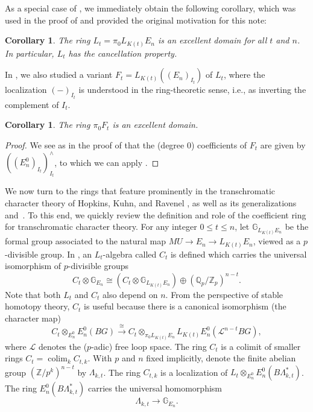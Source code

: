 \documentclass[oneside]{amsart}
\newcommand{\lra}[1]{\overset{#1}{\longrightarrow}}
\newtheorem{cor}[thm]{Corollary}
\theoremstyle{definition}
\theoremstyle{remark}
\theoremstyle{theorem}
\numberwithin{equation}{section}
\DeclareMathOperator{\colim}{colim}
\newcommand{\Q}{\mathbb{Q}}
\newcommand{\E}{E_{n}}
\newcommand{\Z}{\mathbb{Z}}
\newcommand{\lkt}{\Lambda_{k,t}}
\newcommand{\bG}{\mathbb{G}}
\newcommand{\cL}{\mathcal{L}}
\begin{document}
As a special case of , we immediately obtain the following corollary, which was used in the proof of \cite[Lem.~4.4]{bs_bpetheory} and provided the original motivation for this note:

\begin{cor}\label{cor:lt}
The ring $L_t = \pi_0L_{K(t)}E_n$ is an excellent domain for all $t$ and $n$. In particular, $L_t$ has the cancellation property. 
\end{cor}

In \cite{bs_bpetheory}, we also studied a variant $F_t = L_{K(t)}((E_n)_{I_t})$ of $L_t$, where the localization $(-)_{I_t}$ is understood in the ring-theoretic sense, i.e., as inverting the complement of $I_t$. 

\begin{cor}\label{cor:ft}
The ring $\pi_0F_t$ is an excellent domain. 
\end{cor}
\begin{proof}
We see as in the proof of  that the (degree 0) coefficients of $F_t$ are given by $((E_n^0)_{I_t})_{I_t}^{\wedge}$, to which we can apply . 
\end{proof}

We now turn to the rings that feature prominently in the transchromatic character theory of Hopkins, Kuhn, and Ravenel \cite{hkr}, as well as its generalizations~\cite{stapleton_tgcm} and~\cite{bs_centralizers}. To this end, we quickly review the definition and role of the coefficient ring for transchromatic character theory. For any integer $0 \le t \le n$, let $\bG_{L_{K(t)}E_n}$ be the formal group associated to the natural map $MU \to E_n \to L_{K(t)}E_n$, viewed as a $p$-divisible group. In \cite{stapleton_tgcm}, an $L_t$-algebra called $C_t$ is defined which carries the universal isomorphism of $p$-divisible groups
\[
C_t \otimes \bG_{\E} \cong (C_t \otimes \bG_{L_{K(t)}E_n}) \oplus (\Q_p/\Z_p)^{n-t}. 
\]
Note that both $L_t$ and $C_t$ also depend on $n$. From the perspective of stable homotopy theory, $C_t$ is useful because there is a canonical isomorphism (the character map)
\[
C_t \otimes_{E_{n}^0} E_{n}^0(BG) \lra{\cong} C_t \otimes_{\pi_0 L_{K(t)}E_n} L_{K(t)}E_{n}^0(\cL^{n-t}BG),
\]
where $\cL$ denotes the ($p$-adic) free loop space. The ring $C_t$ is a colimit of smaller rings $C_t = \colim_k C_{t,k}$. With $p$ and $n$ fixed implicitly, denote the finite abelian group $(\Z/p^k)^{n-t}$ by $\Lambda_{k,t}$. The ring $C_{t,k}$ is a localization of $L_t \otimes_{\E^0} \E^0(B\lkt^*)$. The ring $\E^0(B\lkt^*)$ carries the universal homomorphism 
\[
\lkt \rightarrow \bG_{E_n}.
\]
\end{document}
